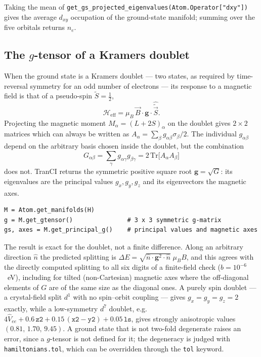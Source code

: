 \documentclass[11pt,a4paper]{article}
\newcommand{\op}[1]{\texttt{#1}}
\begin{document}
Taking the mean of \op{get\_gs\_projected\_eigenvalues(Atom.Operator["dxy"])}
gives the average $d_{xy}$ occupation of the ground-state manifold; summing over
the five orbitals returns $n_e$.

\subsection{The $g$-tensor of a Kramers doublet}
\label{sec:gtensor}

When the ground state is a Kramers doublet --- two states, as required by
time-reversal symmetry for an odd number of electrons --- its response to a
magnetic field is that of a pseudo-spin $\tilde{S}=\tfrac12$,
\begin{equation}
  \mathcal{H}_{\mathrm{eff}}
  = \mu_B\,\vec{B}\cdot \mathbf{g}\cdot \hat{\tilde{\vec{S}}} .
\end{equation}
Projecting the magnetic moment $M_\alpha=(L+2S)_\alpha$ on the doublet gives
$2\times2$ matrices which can always be written as
$A_\alpha=\sum_\beta g_{\alpha\beta}\sigma_\beta/2$.  The individual
$g_{\alpha\beta}$ depend on the arbitrary basis chosen inside the doublet, but
the combination
\begin{equation}
  G_{\alpha\beta}=\sum_\gamma g_{\alpha\gamma}g_{\beta\gamma}
  = 2\,\mathrm{Tr}\big[A_\alpha A_\beta\big]
\end{equation}
does not.  TranCI returns the symmetric positive square root
$\mathbf{g}=\sqrt{G}$: its eigenvalues are the principal values $g_x,g_y,g_z$
and its eigenvectors the magnetic axes.

\begin{lstlisting}
M = Atom.get_manifolds(H)
g = M.get_gtensor()               # 3 x 3 symmetric g-matrix
gs, axes = M.get_principal_g()    # principal values and magnetic axes
\end{lstlisting}

\noindent
The result is exact for the doublet, not a finite difference.  Along an
arbitrary direction $\hat n$ the predicted splitting is
$\Delta E = \sqrt{\hat n\cdot \mathbf{g}^2\cdot\hat n}\;\mu_B B$, and this agrees
with the directly computed splitting to all six digits of a finite-field check
($b=10^{-6}$~eV), including for tilted (non-Cartesian) magnetic axes where the
off-diagonal elements of $G$ are of the same size as the diagonal ones.  A
purely spin doublet --- a crystal-field split $d^1$ with no spin--orbit coupling
--- gives $g_x=g_y=g_z=2$ exactly, while a low-symmetry $d^7$ doublet, e.g.
$4\hat V_{ee}+0.6\,\op{z2}+0.15\,(\op{x2}-\op{y2})+0.05\,\op{ls}$, gives strongly
anisotropic values $(0.81,\,1.70,\,9.45)$.  A ground state that is not two-fold
degenerate raises an error, since a $g$-tensor is not defined for it; the
degeneracy is judged with \op{hamiltonians.tol}, which can be overridden through
the \op{tol} keyword.
\end{document}
